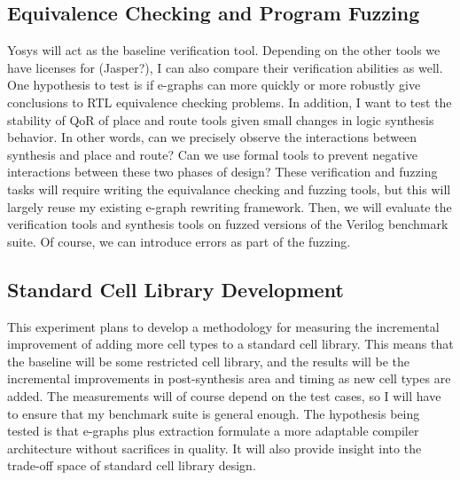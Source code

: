 \documentclass[10pt,letterpaper]{article}
\begin{document}
\subsection{Equivalence Checking and Program Fuzzing}
Yosys will act as the baseline verification tool. Depending on the other tools
we have licenses for (Jasper?), I can also compare their verification abilities
as well. One hypothesis to test is if e-graphs can more quickly or more
robustly give conclusions to RTL equivalence checking problems. In addition, I
want to test the stability of QoR of place and route tools given small changes
in logic synthesis behavior. In other words, can we precisely observe the
interactions between synthesis and place and route? Can we use formal tools to
prevent negative interactions between these two phases of design? These
verification and fuzzing tasks will require writing the equivalance checking
and fuzzing tools, but this will largely reuse my existing e-graph rewriting
framework. Then, we will evaluate the verification tools and synthesis tools on
fuzzed versions of the Verilog benchmark suite. Of course, we can introduce
errors as part of the fuzzing.

\subsection{Standard Cell Library Development}

This experiment plans to develop a methodology for measuring the incremental
improvement of adding more cell types to a standard cell library. This means
that the baseline will be some restricted cell library, and the results will be
the incremental improvements in post-synthesis area and timing as new cell
types are added. The measurements will of course depend on the test cases, so I
will have to ensure that my benchmark suite is general enough. The hypothesis
being tested is that e-graphs plus extraction formulate a more adaptable
compiler architecture without sacrifices in quality. It will also provide
insight into the trade-off space of standard cell library design.
\end{document}
